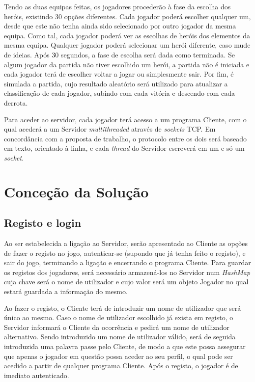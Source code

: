 \documentclass[a4paper]{article}
\begin{document}
\par Tendo as duas equipas feitas, os jogadores procederão à fase da escolha dos heróis, existindo 30 opções diferentes. Cada jogador poderá escolher qualquer um, desde que este não tenha ainda sido selecionado por outro jogador da mesma equipa. Como tal, cada jogador poderá ver as escolhas de heróis dos elementos da mesma equipa. Qualquer jogador poderá selecionar um herói diferente, caso mude de ideias. Após 30 segundos, a fase de escolha será dada como terminada. Se algum jogador da partida não tiver escolhido um herói, a partida não é iniciada e cada jogador terá de escolher voltar a jogar ou simplesmente sair. Por fim, é simulada a partida, cujo resultado aleatório será utilizado para atualizar a classificação de cada jogador, subindo com cada vitória e descendo com cada derrota.

\par Para aceder ao servidor, cada jogador terá acesso a um programa Cliente, com o qual acederá a um Servidor \textit{multithreaded} através de \textit{sockets} TCP. Em concordância com a proposta de trabalho, o protocolo entre os dois será baseado em texto, orientado à linha, e cada \textit{thread} do Servidor escreverá em um e só um \textit{socket}.


\pagebreak
\clearpage

\section{Conceção da Solução}
\label{sec:3}

\subsection{Registo e login}
\label{sec:3.1}

\hspace{3mm} Ao ser estabelecida a ligação ao Servidor, serão apresentado ao Cliente as opções de fazer o registo no jogo, autenticar-se (supondo que já tenha feito o registo), e sair do jogo, terminando a ligação e encerrando o programa Cliente. Para guardar os registos dos jogadores, será necessário armazená-los no Servidor num \textit{HashMap} cuja chave será o nome de utilizador e cujo valor será um objeto Jogador no qual estará guardada a informação do mesmo.

\par Ao fazer o registo, o Cliente terá de introduzir um nome de utilizador que será único ao mesmo. Caso o nome de utilizador escolhido já exista em registo, o Servidor informará o Cliente da ocorrência e pedirá um nome de utilizador alternativo. Sendo introduzido um nome de utilizador válido, será de seguida introduzida uma palavra passe pelo Cliente, de modo a que este possa assegurar que apenas o jogador em questão possa aceder ao seu perfil, o qual pode ser acedido a partir de qualquer programa Cliente. Após o registo, o jogador é de imediato autenticado.
\end{document}
